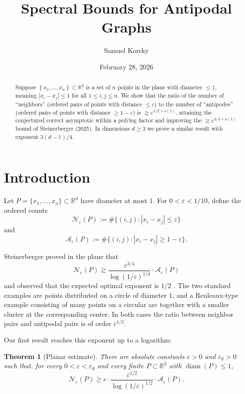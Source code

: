 \documentclass[11pt]{article}
\title{Spectral Bounds for Antipodal Graphs}
\author{Samuel Korsky}
\date{February 28, 2026}
\newtheorem{theorem}{Theorem}[section]
\newcommand{\R}{\mathbb R}
\newcommand{\eps}{\varepsilon}
\newcommand{\diam}{\operatorname{diam}}
\newcommand{\cN}{\mathcal N}
\newcommand{\cA}{\mathcal A}
\begin{document}
\maketitle

\begin{abstract}
\noindent
Suppose $\left\{x_1, \dots, x_n\right\} \subset \mathbb{R}^2$ is a set of $n$ points in the plane with diameter $\leq 1$, meaning $|x_i - x_j| \leq 1$ for all $1 \leq i,j \leq n$. We show that the ratio of the number of ``neighbors'' (ordered pairs of points with distance $\leq \varepsilon$) to the number of ``antipodes'' (ordered pairs of points with distance $\geq 1 - \varepsilon$) is $\gtrsim\varepsilon^{1/2 + o(1)}$, attaining the conjectured correct asymptotic within a polylog factor and improving the $\gtrsim\varepsilon^{3/4+o(1)}$ bound of Steinerberger (2025). In dimensions $d\ge3$ we prove a similar result with exponent $3(d - 1)/4$.
\end{abstract}

\section{Introduction}

Let $P=\{x_1,\ldots,x_n\}\subset\R^d$ have diameter at most $1$.  For $0<\eps<1/10$, define the ordered counts
\[
   \cN_\eps(P):=\#\{(i,j): |x_i-x_j|\le \eps\}
\]
and
\[
   \cA_\eps(P):=\#\{(i,j): |x_i-x_j|\ge 1-\eps\}.
\]

\bigskip
\noindent
Steinerberger proved in the plane that
\[
   \cN_\eps(P)
   \gtrsim
   \frac{\eps^{3/4}}{\log(1/\eps)^{1/4}}\cdot\cA_\eps(P)
\]
and observed that the expected optimal exponent is $1/2$ \cite{Steinerberger2025}.  The two standard examples are points distributed on a circle of diameter $1$, and a Reuleaux-type example consisting of many points on a circular arc together with a smaller cluster at the corresponding center.  In both cases the ratio between neighbor pairs and antipodal pairs is of order $\eps^{1/2}$.

\bigskip
\noindent
Our first result reaches this exponent up to a logarithm:

\begin{theorem}[Planar estimate]\label{thm:plane}
There are absolute constants $c>0$ and $\eps_0>0$ such that, for every $0<\eps<\eps_0$ and every finite $P\subset\R^2$ with $\diam(P)\le1$,
\[
   \cN_\eps(P)
   \ge
   c\cdot\frac{\eps^{1/2}}{\log(1/\eps)^{1/2}}\cdot\cA_\eps(P).
\]
\end{theorem}
\end{document}
